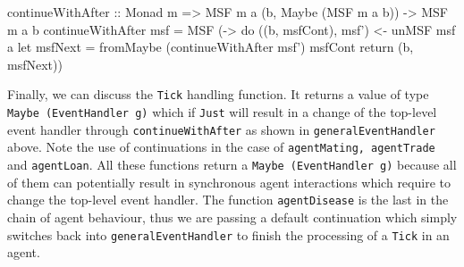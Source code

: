 \begin{HaskellCode}
continueWithAfter :: Monad m => MSF m a (b, Maybe (MSF m a b)) -> MSF m a b
continueWithAfter msf = MSF (\a -> do
  ((b, msfCont), msf') <- unMSF msf a
  let msfNext = fromMaybe (continueWithAfter msf') msfCont
  return (b, msfNext))
\end{HaskellCode}

Finally, we can discuss the \texttt{Tick} handling function. It returns a value of type \texttt{Maybe (EventHandler g)} which if \texttt{Just} will result in a change of the top-level event handler through \texttt{continueWithAfter} as shown in \texttt{generalEventHandler} above. Note the use of continuations in the case of \texttt{agentMating, agentTrade} and \texttt{agentLoan}. All these functions return a \texttt{Maybe (EventHandler g)} because all of them can potentially result in synchronous agent interactions which require to change the top-level event handler. The function \texttt{agentDisease} is the last in the chain of agent behaviour, thus we are passing a default continuation which simply switches back into \texttt{generalEventHandler} to finish the processing of a \texttt{Tick} in an agent.

